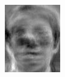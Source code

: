 \begin{frame}
\begin{columns}
\begin{overlayarea}{\textwidth}{\textheight}
{\begin{minipage}[t]{0.15\textwidth}
          \includegraphics[width=\textwidth]{images/eig_docked_image/eig_15.jpeg}
        \end{minipage}
        \begin{minipage}[t]{0.15\textwidth}

\end{minipage}}
\end{overlayarea}
\end{columns}
\end{frame}
